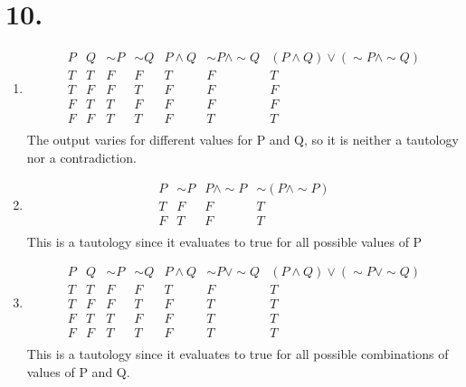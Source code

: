 \documentclass[12pt,letterpaper]{article}
\begin{document}
\section*{10.}
\begin{enumerate}[label= \textbf{\alph*)}]
	\item
		\begin{displaymath}
			\begin{array}{|c|c|c|c|c|c|c|}
				P & Q & \sim P & \sim Q & P \land Q & \sim P \land \sim Q & (P \land Q) \lor (\sim P \land \sim Q)\\ 
				\hline
				T & T & F & F & T & F & T\\
				T & F & F & T & F & F & F\\
				F & T & T & F & F & F & F\\
				F & F & T & T & F & T & T\\
			\end{array}
		\end{displaymath}
		The output varies for different values for P and Q, so it is neither a tautology nor a contradiction.
		
	\item
		\begin{displaymath}
			\begin{array}{|c|c|c|c|}
			P & \sim P & P \land \sim P & \sim (P \land \sim P)\\ 
			\hline
			T & F & F & T\\
			F & T & F & T\\
			\end{array}
		\end{displaymath}
		This is  a tautology since it evaluates to true for all possible values of P
	\newpage
		\item \begin{displaymath}
			\begin{array}{|c|c|c|c|c|c|c|}
				P & Q & \sim P & \sim Q & P \land Q & \sim P \lor \sim Q & (P \land Q) \lor (\sim P \lor \sim Q)\\ 
				\hline
				T & T & F & F & T & F & T\\
				T & F & F & T & F & T & T\\
				F & T & T & F & F & T & T\\
				F & F & T & T & F & T & T\\
			\end{array}
		\end{displaymath}
		This is  a tautology since it evaluates to true for all possible combinations
		of values of P and Q.


\end{enumerate}
\end{document}
